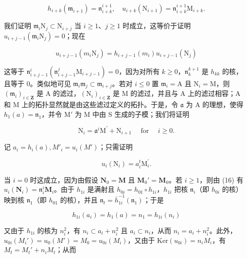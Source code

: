 \[
h _ {i + k} \left(\mathfrak {m} _ {i + 1}\right) = \mathfrak {n} _ {i + k} ^ {i + 1}, \quad u _ {i + k} \left(\mathrm{N} _ {i + 1}\right) = \mathfrak {n} _ {i + k} ^ {i + 1} \mathrm{M} _ {i + k}.\tag{16}
\]

	我们证明 \(\mathfrak{m}_i\mathrm{N}_j\subset \mathrm{N}_{i + j}\) 当 \(i\geqslant 1\)、\(j\geqslant 1\) 时成立，这等价于证明 \(u_{i + j - 1}(\mathfrak{m}_i\mathrm{N}_j) = 0\)；现在

\[
u _ {i + j - 1} (m _ {i} \mathrm{N} _ {j}) = h _ {i + j - 1} (m _ {i}) u _ {i + j - 1} (\mathrm{N} _ {j})
\]

	这等于 \(\mathfrak{n}_{i+j-1}^{i}(\mathfrak{n}_{i+j-1}^{j}\mathrm{M}_{i+j-1}) = 0\)，因为对所有 \(k \geqslant 0\)，\(\mathfrak{n}_k^{k+1}\) 是 \(h_{kk}\) 的核，且等于 0。类似地可见 \(\mathfrak{m}_i\mathfrak{m}_j \subset \mathfrak{m}_{i+j}\)。若对 \(i \leqslant 0\) 置 \(\mathfrak{m}_i = \mathrm{A}\) 且 \(\mathrm{N}_i = \mathrm{M}\)，则 \((\mathfrak{m}_i)_{i \in \mathbf{Z}}\) 是 \(\mathrm{A}\) 的滤过，\((\mathrm{N}_i)_{i \in \mathbf{Z}}\) 是 \(\mathrm{M}\) 的滤过，并且与 \(\mathrm{A}\) 上的滤过相容；\(\mathrm{A}\) 和 \(\mathrm{M}\) 上的拓扑显然就是由这些滤过定义的拓扑。于是，令 \(\mathfrak{a}\) 为 \(\mathrm{A}\) 的理想，使得 \(h_1(a) = \mathfrak{n}_1\)，并令 \(\mathrm{M}'\) 为 \(\mathrm{M}\) 中由 \(\mathrm{S}\) 生成的子模；我们将证明

\[
\mathrm{N} _ {i} = \mathfrak {a} ^ {i} \mathrm{M} ^ {\prime} + \mathrm{N} _ {i + 1} \quad \text { for } \quad i \geqslant 0.\tag{17}
\]

	记 \(a_i = h_i(a), M'_i = u_i(M')\)；只需证明

\[
u _ {i} \left(\mathrm{N} _ {i}\right) = a _ {i} ^ {t} \mathrm{M} _ {i} ^ {\prime}.
\]

	当 \(i = 0\) 时这成立，因为由假设 \(\mathbf{N}_0 = \mathbf{M}\) 且 \(\mathbf{M}_0' = \mathbf{M}_0\)。若 \(i \geqslant 1\)，则由 (16) 有 \(u_i(\mathbf{N}_i) = \mathfrak{n}_i^i\mathbf{M}_i\)。由于 \(h_{1i}\) 是满射且 \(h_{0i} = h_{01} \circ h_{1i}\)，\(h_{1i}\) 把核 \(\mathfrak{n}_i\)（即 \(h_{0i}\) 的核）映到核 \(\mathfrak{n}_1\)（即 \(h_{01}\) 的核），并且 \(\mathfrak{n}_t = \overline{h}_{1i}^{-1}(\mathfrak{n}_1)\)；于是

\[
h _ {1 i} (a _ {i}) = h _ {1} (a) = n _ {1} = h _ {1 i} (n _ {i})
\]

	又由于 \(h_{1i}\) 的核为 \(n_i^2\)，有 \(n_i \subset a_i + n_i^2\) 且 \(a_i \subset n_i\)，从而 \(n_i = a_i + n_i^2\)。此外，\(u_{0i}(M_i') = u_0(M') = M_0 = u_{0i}(M_i)\)，又由于 \(\text{Ker}(u_{0i}) = n_iM_i\)，有 \(M_t = M_t' + n_iM_t\)；从而

